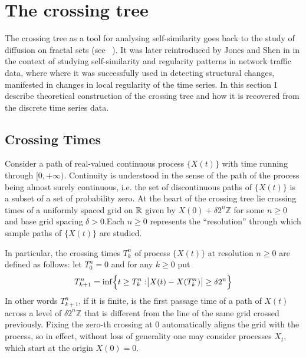 \chapter{The crossing tree} %
\label{cha:the_crossing_tree}

The crossing tree as a tool for analysing self-similarity goes back to the study of
diffusion on fractal sets (see ~\cite{BarlowPerkins88}). It was later reintroduced by Jones
and Shen in \cite{jones2004} in the context of studying self-similarity and regularity
patterns in network traffic data, where where it was successfully used in detecting
structural changes, manifested in changes in local regularity of the time series.
In this section I describe theoretical construction of the crossing tree and how
it is recovered from the discrete time series data.

\section{Crossing Times} %
\label{sec:crossing_times}

Consider a path of real-valued continuous process $\{X(t)\}$ with time running through
$[0,+\infty)$. Continuity is understood in the sense of the path of the process
being almost surely continuous, i.e. the set of discontinuous paths of $\{X(t)\}$
is a subset of a set of probability zero. At the heart of the crossing tree lie
crossing times of a uniformly spaced grid on $\mathbb{R}$ given by $X(0) + \delta 2^n \mathbb{Z}$
for some $n\geq 0$ and base grid spacing $\delta > 0$.\footnotemark Each $n\geq 0$
represents the ``resolution'' through which sample paths of $\{X(t)\}$ are studied.

In particular, the crossing times $T_k^n$ of process $\{X(t)\}$ at resolution $n\geq 0$
are defined as follows: let $T_0^n = 0$ and for any $k\geq 0$ put
\[
T_{k+1}^n
= \inf \Bigl\{ t \geq T^n_k : \bigr | X(t) - X(T^n_k) \bigr | \geq \delta 2^n \Bigr\}
\]
In other words $T_{k+1}^n$, if it is finite, is the first passage time of a path of
$X(t)$ across a level of $\delta 2^n \mathbb{Z}$ that is different from the line of
the same grid crossed previously. Fixing the zero-th crossing at $0$ automatically
aligns the grid with the process, so in effect, without loss of generality one may
consider processes $X_t$, which start at the origin $X(0)=0$.

